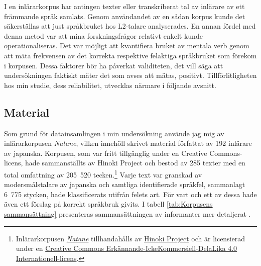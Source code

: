 \documentclass[12pt,a4paper]{article}
\begin{document}
I en inlärarkorpus har antingen texter eller transkriberat tal av inlärare av ett främmande språk samlats. Genom användandet av en sådan korpus kunde det säkerställas att just språkbruket hos L2-talare analyserades. En annan fördel med denna metod var att mina forskningsfrågor relativt enkelt kunde operationaliseras. Det var möjligt att kvantifiera bruket av mentala verb genom att mäta frekvensen av det korrekta respektive felaktiga språkbruket som förekom i korpusen. Dessa faktorer bör ha påverkat validiteten, det vill säga att undersökningen faktiskt mäter det som avses att mätas, positivt. Tillförlitligheten hos min studie, dess reliabilitet, utvecklas närmare i följande avsnitt.

\subsection{Material}
\label{sec:Undersökningen: Material}
Som grund för datainsamlingen i min undersökning använde jag mig av inlärarkorpusen \emph{Natane}, vilken innehöll skrivet material författat av 192 inlärare av japanska. Korpusen, som var fritt tillgänglig under en Creative Commons-licens, hade sammanställts av Hinoki Project och bestod av 285 texter med en total omfattning av 205~520 tecken.\footnote{Inlärarkorpusen \href{https://hinoki-project.org/natane/}{\emph{Natane}} tillhandahålls av \href{https://hinoki-project.org/}{Hinoki Project} och är licensierad under en \href{https://creativecommons.org/licenses/by-nc-sa/4.0/deed.sv}{Creative Commons Erkännande-IckeKommersiell-DelaLika 4.0 Internationell-licens}.} Varje text var granskad av modersmålstalare av japanska och samtliga identifierade språkfel, sammanlagt 6~775 stycken, hade klassificerats utifrån felets art. För vart och ett av dessa hade även ett förslag på korrekt språkbruk givits. I tabell \ref{tab:Korpusens sammansättning} presenteras sammansättningen av informanter mer detaljerat \autocite{hinokiproject2012}.
\end{document}
